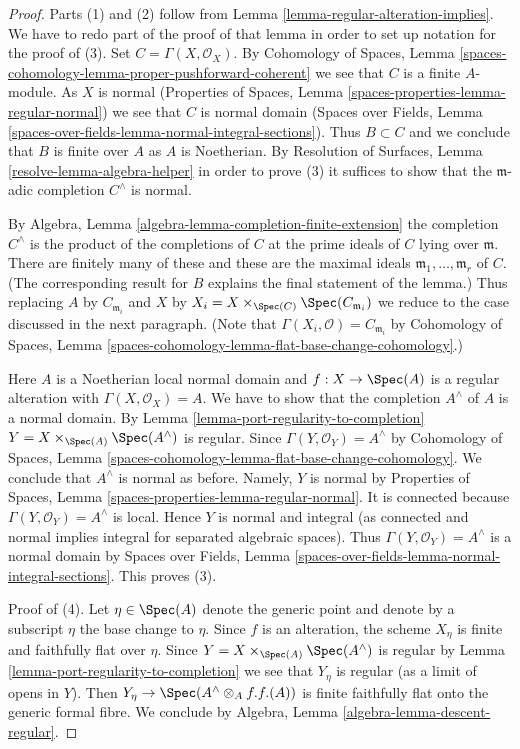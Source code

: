 \begin{proof}
Parts (1) and (2) follow from Lemma \ref{lemma-regular-alteration-implies}.
We have to redo part of the proof of that lemma in order to set up notation
for the proof of (3). Set $C = \Gamma(X, \mathcal{O}_X)$. By
Cohomology of Spaces, Lemma
\ref{spaces-cohomology-lemma-proper-pushforward-coherent}
we see that $C$ is a finite $A$-module.
As $X$ is normal
(Properties of Spaces, Lemma
\ref{spaces-properties-lemma-regular-normal})
we see that $C$ is normal domain
(Spaces over Fields, Lemma
\ref{spaces-over-fields-lemma-normal-integral-sections}).
Thus $B \subset C$ and we conclude that $B$ is finite over $A$
as $A$ is Noetherian. By
Resolution of Surfaces, Lemma \ref{resolve-lemma-algebra-helper}
in order to prove (3) it suffices to show
that the $\mathfrak m$-adic completion $C^\wedge$ is normal.

\medskip\noindent
By Algebra, Lemma \ref{algebra-lemma-completion-finite-extension}
the completion $C^\wedge$ is the product of the completions of
$C$ at the prime ideals of $C$ lying over $\mathfrak m$.
There are finitely many of these and these are the maximal
ideals $\mathfrak m_1, \ldots, \mathfrak m_r$ of $C$.
(The corresponding result for $B$ explains the final statement of the lemma.)
Thus replacing $A$ by $C_{\mathfrak m_i}$ and $X$ by
$X_i = X \times_{\Spec(C)} \Spec(C_{\mathfrak m_i})$
we reduce to the case discussed in the next paragraph.
(Note that $\Gamma(X_i, \mathcal{O}) = C_{\mathfrak m_i}$ by
Cohomology of Spaces,
Lemma \ref{spaces-cohomology-lemma-flat-base-change-cohomology}.)

\medskip\noindent
Here $A$ is a Noetherian local normal domain and $f : X \to \Spec(A)$
is a regular alteration with $\Gamma(X, \mathcal{O}_X) = A$.
We have to show that the completion $A^\wedge$
of $A$ is a normal domain. By
Lemma \ref{lemma-port-regularity-to-completion}
$Y = X \times_{\Spec(A)} \Spec(A^\wedge)$ is regular.
Since $\Gamma(Y, \mathcal{O}_Y) = A^\wedge$
by Cohomology of Spaces,
Lemma \ref{spaces-cohomology-lemma-flat-base-change-cohomology}.
We conclude that $A^\wedge$ is normal as before.
Namely, $Y$ is normal by Properties of Spaces, Lemma
\ref{spaces-properties-lemma-regular-normal}.
It is connected because $\Gamma(Y, \mathcal{O}_Y) = A^\wedge$ is local.
Hence $Y$ is normal and integral (as connected and normal
implies integral for separated algebraic spaces). Thus
$\Gamma(Y, \mathcal{O}_Y) = A^\wedge$ is a normal domain by
Spaces over Fields, Lemma
\ref{spaces-over-fields-lemma-normal-integral-sections}.
This proves (3).

\medskip\noindent
Proof of (4). Let $\eta \in \Spec(A)$ denote the generic point
and denote by a subscript $\eta$ the base change to $\eta$.
Since $f$ is an alteration, the scheme $X_\eta$ is finite and
faithfully flat over $\eta$. Since $Y = X \times_{\Spec(A)} \Spec(A^\wedge)$
is regular by Lemma \ref{lemma-port-regularity-to-completion}
we see that $Y_\eta$ is regular (as a limit of opens in $Y$).
Then $Y_\eta \to \Spec(A^\wedge \otimes_A f.f.(A))$ is finite
faithfully flat onto the generic formal fibre. We conclude by
Algebra, Lemma \ref{algebra-lemma-descent-regular}.
\end{proof}
